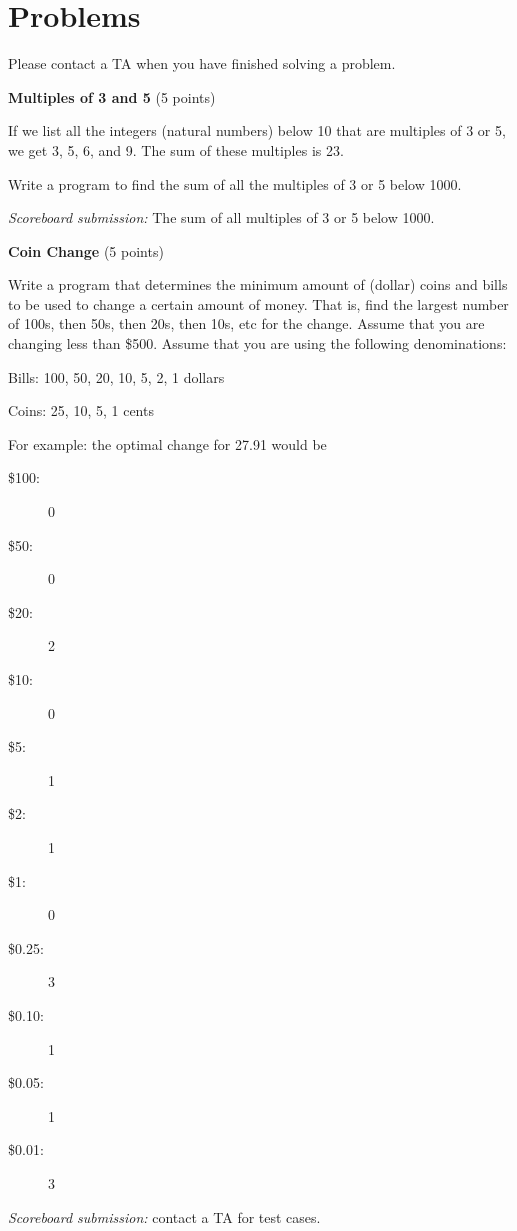 \documentclass[11pt]{cselabheader}
\theoremstyle{plain}
\begin{document}
\pagebreak
\section{Problems}
Please contact a TA when you have finished solving a problem.

\begin{prob}[multiples.py]
    \textbf{Multiples of 3 and 5} (5 points)

    If we list all the integers (natural numbers) below 10 that are
    multiples of 3 or 5, we get 3, 5, 6, and 9. The sum of these multiples
    is 23.

    Write a program to find the sum of all the multiples of 3 or 5 below
    1000.

    \textit{Scoreboard submission:} The sum of all multiples of 3 or 5
    below 1000.
\end{prob}


\begin{prob}[change.py]
\textbf{Coin Change} (5 points)

Write a program that determines the minimum amount of (dollar) coins and 
bills to be used to change a certain amount of money. That is, find the largest
number of 100s, then 50s, then 20s, then 10s, etc for the change. Assume that
you are changing less than \$500.  Assume that you are using the following
denominations:

Bills: 100, 50, 20, 10, 5, 2, 1 dollars

Coins: 25, 10, 5, 1 cents

For example: the optimal change for 27.91 would be
\begin{multicols}{6}
\begin{description}
\item[\$100:] 0
\item[\$50:] 0
\item[\$20:] 2
\item[\$10:] 0
\item[\$5:] 1
\item[\$2:] 1
\item[\$1:] 0
\item[\$0.25:] 3
\item[\$0.10:] 1
\item[\$0.05:] 1
\item[\$0.01:] 3
\end{description}
\end{multicols}

\textsl{Scoreboard submission:} contact a TA for test cases. 
\end{prob}
\end{document}
